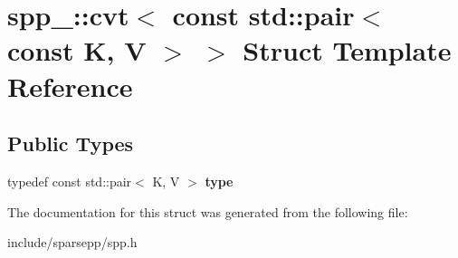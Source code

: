 \hypertarget{structspp___1_1cvt_3_01const_01std_1_1pair_3_01const_01_k_00_01_v_01_4_01_4}{}\section{spp\+\_\+\+:\+:cvt$<$ const std\+:\+:pair$<$ const K, V $>$ $>$ Struct Template Reference}
\label{structspp___1_1cvt_3_01const_01std_1_1pair_3_01const_01_k_00_01_v_01_4_01_4}
\subsection*{Public Types}
\begin{DoxyCompactItemize}
\item 
typedef const std\+::pair$<$ K, V $>$ {\bfseries type}\hypertarget{structspp___1_1cvt_3_01const_01std_1_1pair_3_01const_01_k_00_01_v_01_4_01_4_aab542d295cad07910ac9bf7110b71c40}{}\label{structspp___1_1cvt_3_01const_01std_1_1pair_3_01const_01_k_00_01_v_01_4_01_4_aab542d295cad07910ac9bf7110b71c40}

\end{DoxyCompactItemize}


The documentation for this struct was generated from the following file\+:\begin{DoxyCompactItemize}
\item 
include/sparsepp/spp.\+h\end{DoxyCompactItemize}
